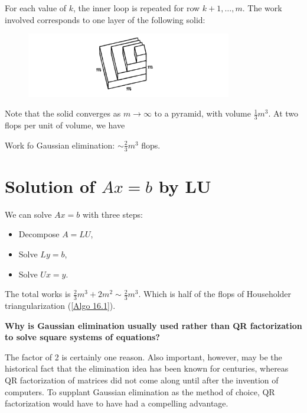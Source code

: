 For each value of $k$, the inner loop is repeated for row $k+1,\ldots ,m$. The work involved corresponds to one layer of the following solid: 

\begin{figure}[H]
    \centering
    \includegraphics[width=0.8\textwidth]{figures/20-1.png}
\end{figure}
Note that the solid converges as $m\to \infty$ to a pyramid, with volume $\frac{1}{3}m^3$. At two flops per unit of volume, we have 

\begin{corollary}
\label{cor: Work for GE}
Work fo Gaussian elimination: $ \sim \frac{2}{3}m^3 $ flops. 
\end{corollary}

\section{Solution of $Ax=b$ by LU}
We can solve $Ax=b$ with three steps: 
\begin{itemize}
    \item Decompose $A= LU$, 
    \item Solve $Ly=b$,
    \item Solve $Ux=y$. 
\end{itemize}
The total works is $\frac{2}{3}m^3 + 2m^2\sim \frac{2}{3}m^3$. Which is half of the flops of Householder triangularization (\autoref{Algo 16.1}).  


\begin{note}
   \textbf{ Why is Gaussian elimination usually used rather than QR factorization to solve square systems of equations?} 
   
   The factor of 2 is certainly one reason. Also important, however, may be the historical fact that the elimination idea has been known for centuries, whereas QR factorization of matrices did not come along until after the invention of computers. To supplant Gaussian elimination as the method of choice, QR factorization would have to have had a compelling advantage.
\end{note}

